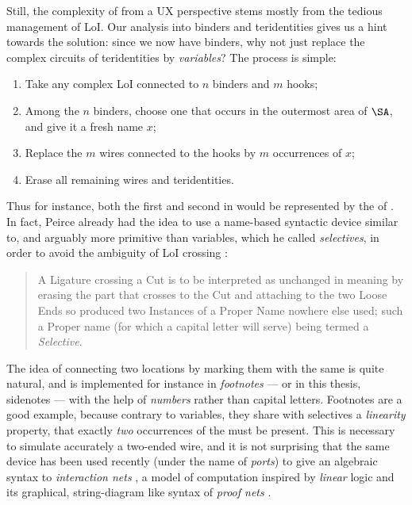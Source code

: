 \begin{scope}
Still, the complexity of  from a UX perspective stems mostly from the
tedious management of LoI. Our analysis into binders and teridentities gives us
a hint towards the solution: since we now have binders, why not just replace
the complex circuits of teridentities by \emph{variables}? The process is
simple:
\begin{enumerate}
  \item Take any complex LoI connected to $n$ binders and $m$ hooks;
  \item Among the $n$ binders, choose one that occurs in the outermost area of
  $\SA$, and give it a fresh name $x$;
  \item Replace the $m$ wires connected to the hooks by $m$ occurrences of $x$;
  \item Erase all remaining wires and teridentities.
\end{enumerate}
Thus for instance, both the first and second  in
 would be represented by the  of
. In fact, Peirce already had the idea to use a
name-based syntactic device similar to, and arguably more primitive than
variables, which he called \emph{selectives}, in order to avoid the ambiguity of
LoI crossing  \cite[p.~531]{peirce_prolegomena_1906}:
\begin{quote}
A Ligature crossing a Cut is to be interpreted as unchanged in meaning by
erasing the part that crosses to the Cut and attaching to the two Loose Ends so
produced two Instances of a Proper Name nowhere else used; such a Proper name
(for which a capital letter will serve) being termed a \emph{Selective}.
\end{quote}
The idea of connecting two locations by marking them with the same  is
quite natural, and is implemented for instance in \emph{footnotes} --- or in
this thesis, sidenotes --- with the help of \emph{numbers} rather than capital
letters. Footnotes are a good example, because contrary to variables, they share
with selectives a \emph{linearity} property, that exactly \emph{two} occurrences
of the  must be present. This is necessary to simulate accurately a
two-ended wire, and it is not surprising that the same device has been used
recently (under the name of \emph{ports}) to give an algebraic syntax to
\emph{interaction nets} , a model of
computation inspired by \emph{linear} logic and its graphical, string-diagram
like syntax of \emph{proof nets} \cite{girard-linear-1987}.


\end{scope}
